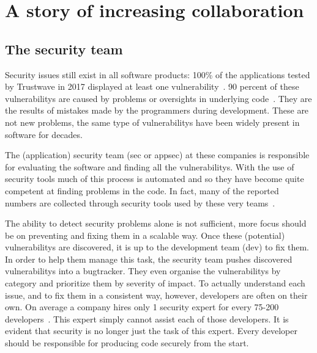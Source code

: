 
\section{A story of increasing collaboration}
\subsection{The security team}
Security issues still exist in all software products: 100\% of the applications tested by Trustwave in 2017 displayed at least one \gls{vulnerability}~\cite{trustwave}. 90 percent of these \glspl{vulnerability} are caused by problems or oversights in underlying code~\cite{softwareassurance}. They are the results of mistakes made by the programmers during development. These are not new problems, the same type of \glspl{vulnerability} have been widely present in software for decades.

The (application) security team (\Gls{sec} or \Gls{appsec}) at these companies is responsible for evaluating the software and finding all the \glspl{vulnerability}. With the use of security tools much of this process is automated and so they have become quite competent at finding problems in the code. In fact, many of the reported numbers are collected through security tools used by these very teams~\cite{owasptop10data}. 

The ability to detect \glspl{security problem} alone is not sufficient, more focus should be on preventing and fixing them in a scalable way.
Once these (potential) \glspl{vulnerability} are discovered, it is up to the development team (\Gls{dev}) to fix them. 
In order to help them manage this task, the security team pushes discovered \glspl{vulnerability} into a \gls{bugtracker}. They even organise the \glspl{vulnerability} by category and prioritize them by severity of impact. To actually understand each \gls{issue}, and to fix them in a consistent way, however, developers are often on their own.
On average a company hires only 1 security expert for every 75-200 developers~\cite{bsimm9, bsimm11, shiftleftsurvey}. This expert simply cannot assist each of those developers. 
It is evident that security is no longer just the task of this expert. Every developer should be responsible for producing code securely from the start. 

